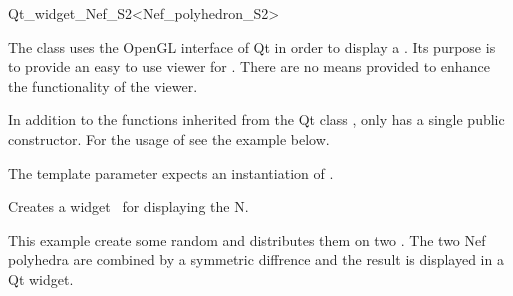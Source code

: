 
\ccRefPageBegin



\begin{ccRefClass}{Qt_widget_Nef_S2<Nef_polyhedron_S2>}

\ccDefinition
 
The class  uses the OpenGL interface of Qt in order to 
display a
. Its purpose is to provide an easy to use viewer for 
. There are no means provided to enhance the 
functionality of the viewer.

In addition to the functions inherited from the Qt class , 
 only has a single public 
constructor. For the usage of  see the example 
below.


\ccParameters
The template parameter expects an instantiation of .


\ccCreation
{}

{Creates a widget \ccVar\ for displaying the  N.}

\ccSeeAlso


\ccExample
This example create some random  and distributes them on
two . The two Nef polyhedra are combined by a symmetric
diffrence and the result is displayed in a Qt widget.


\end{ccRefClass}

\ccRefPageEnd
